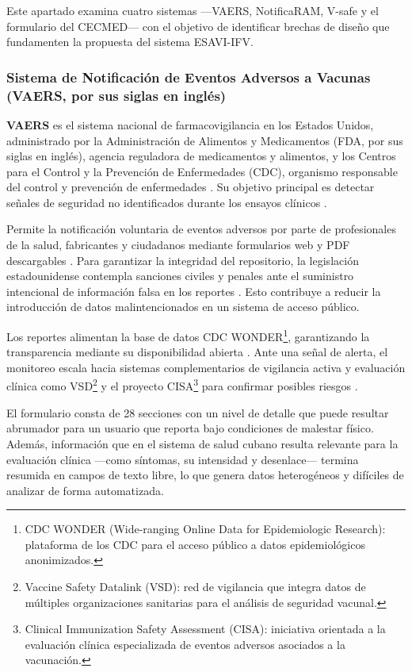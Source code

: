 Este apartado examina cuatro sistemas —VAERS, NotificaRAM, V-safe y el formulario del CECMED— con el objetivo de identificar brechas de diseño que fundamenten la propuesta del sistema ESAVI-IFV.

\subsubsection{Sistema de Notificación de Eventos Adversos a Vacunas (VAERS, por sus siglas en inglés)}

\textbf{VAERS} es el sistema nacional de farmacovigilancia en los Estados Unidos, administrado por la Administración de Alimentos y Medicamentos (FDA, por sus siglas en inglés), agencia reguladora de medicamentos y alimentos, y los Centros para el Control y la Prevención de Enfermedades (CDC), organismo responsable del control y prevención de enfermedades \cite{fda_vaers}.
Su objetivo principal es detectar señales de seguridad no identificados durante los ensayos clínicos \cite{cdc_vaers}.

Permite la notificación voluntaria de eventos adversos por parte de profesionales de la salud, fabricantes y ciudadanos mediante formularios web y PDF descargables \cite{vaers_official}.
Para garantizar la integridad del repositorio, la legislación estadounidense contempla sanciones civiles y penales ante el suministro intencional de información falsa en los reportes \cite{vaers_official}. 
Esto contribuye a reducir la introducción de datos malintencionados en un sistema de acceso público.

Los reportes alimentan la base de datos CDC WONDER\footnote{CDC WONDER (Wide-ranging Online Data for Epidemiologic Research): plataforma de los CDC para el acceso público a datos epidemiológicos anonimizados.}, garantizando la transparencia mediante su disponibilidad abierta \cite{vaers_official}. 
Ante una señal de alerta, el monitoreo escala hacia sistemas complementarios de vigilancia activa y evaluación clínica como VSD\footnote{Vaccine Safety Datalink (VSD): red de vigilancia que integra datos de múltiples organizaciones sanitarias para el análisis de seguridad vacunal.} y el proyecto CISA\footnote{Clinical Immunization Safety Assessment (CISA): iniciativa orientada a la evaluación clínica especializada de eventos adversos asociados a la vacunación.} para confirmar posibles riesgos \cite{cdc_vaers}.

El formulario consta de 28 secciones con un nivel de detalle que puede resultar abrumador para un usuario que reporta bajo condiciones de malestar físico. 
Además, información que en el sistema de salud cubano resulta relevante para la evaluación clínica —como síntomas, su intensidad y desenlace— termina resumida en campos de texto libre, lo que genera datos heterogéneos y difíciles de analizar de forma automatizada.


